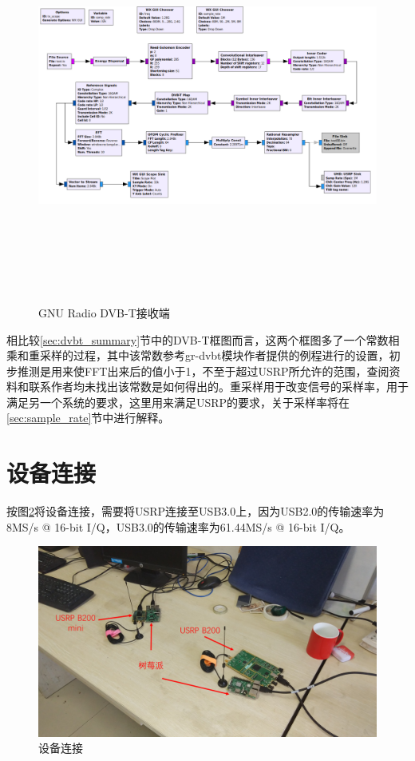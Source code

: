 		\begin{figure}[htbp]
			\centering
			\includegraphics[height=13cm,angle=-90]{figures/gnuradio_dvbt_tx.png}
			\caption{GNU Radio DVB-T接收端}
			\label{fig:gnuradio_dvbt_rx}
		\end{figure}
		\par 相比较\ref{sec:dvbt_summary}节中的DVB-T框图而言，这两个框图多了一个常数相乘和重采样的过程，其中该常数参考gr-dvbt模块作者提供的例程进行的设置，初步推测是用来使FFT出来后的值小于1，不至于超过USRP所允许的范围，查阅资料和联系作者均未找出该常数是如何得出的。重采样用于改变信号的采样率，用于满足另一个系统的要求，这里用来满足USRP的要求，关于采样率将在\ref{sec:sample_rate}节中进行解释。
	\section{设备连接}
		\par 按图\ref{fig:devices}将设备连接，需要将USRP连接至USB3.0上，因为USB2.0的传输速率为8MS/s @ 16-bit I/Q，USB3.0的传输速率为61.44MS/s @ 16-bit I/Q。
		\begin{figure}[htp]
			\centering
			\includegraphics[width=13cm]{figures/devices.png}
			\caption{设备连接}
			\label{fig:devices}
		\end{figure}
